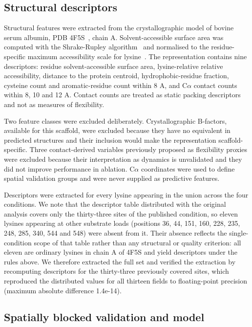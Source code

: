 \documentclass[journal=jprobs,manuscript=article,layout=traditional]{achemso}
\begin{document}
\subsection{Structural descriptors}

Structural features were extracted from the crystallographic model of bovine serum albumin, PDB 4F5S~\cite{bujacz2012}, chain A. Solvent-accessible surface area was computed with the Shrake-Rupley algorithm~\cite{shrake1973} and normalised to the residue-specific maximum accessibility scale for lysine~\cite{tien2013}. The representation contains nine descriptors: residue solvent-accessible surface area, lysine-relative relative accessibility, distance to the protein centroid, hydrophobic-residue fraction, cysteine count and aromatic-residue count within 8 A, and C$\alpha$ contact counts within 8, 10 and 12 A. Contact counts are treated as static packing descriptors and not as measures of flexibility.

Two feature classes were excluded deliberately. Crystallographic B-factors, available for this scaffold, were excluded because they have no equivalent in predicted structures and their inclusion would make the representation scaffold-specific. Three contact-derived variables previously proposed as flexibility proxies were excluded because their interpretation as dynamics is unvalidated and they did not improve performance in ablation. C$\alpha$ coordinates were used to define spatial validation groups and were never supplied as predictive features.

Descriptors were extracted for every lysine appearing in the union across the four conditions. We note that the descriptor table distributed with the original analysis covers only the thirty-three sites of the published condition, so eleven lysines appearing at other substrate loads (positions 36, 44, 151, 160, 228, 235, 248, 285, 340, 544 and 548) were absent from it. Their absence reflects the single-condition scope of that table rather than any structural or quality criterion: all eleven are ordinary lysines in chain A of 4F5S and yield descriptors under the rules above. We therefore extracted the full set and verified the extraction by recomputing descriptors for the thirty-three previously covered sites, which reproduced the distributed values for all thirteen fields to floating-point precision (maximum absolute difference 1.4e-14).

\subsection{Spatially blocked validation and model}
\end{document}

